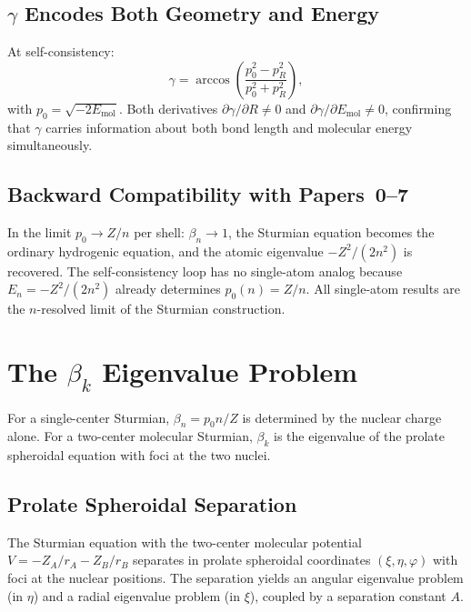 \documentclass[aps,pra,twocolumn,superscriptaddress,longbibliography]{revtex4-2}
\theoremstyle{remark}
\theoremstyle{plain}
\begin{document}
\subsection{$\gamma$ Encodes Both Geometry and Energy}

At self-consistency:
\begin{equation}
\gamma = \arccos\!\left(\frac{p_0^2 - p_R^2}{p_0^2 + p_R^2}\right),
\label{eq:gamma_sc}
\end{equation}
with $p_0 = \sqrt{-2E_{\text{mol}}}$.  Both derivatives
$\partial\gamma/\partial R \neq 0$ and
$\partial\gamma/\partial E_{\text{mol}} \neq 0$, confirming that
$\gamma$ carries information about both bond length and molecular
energy simultaneously.

\subsection{Backward Compatibility with Papers~0--7}

In the limit $p_0 \to Z/n$ per shell: $\beta_n \to 1$, the Sturmian
equation becomes the ordinary hydrogenic equation, and the atomic
eigenvalue $-Z^2/(2n^2)$ is recovered.  The self-consistency loop has
no single-atom analog because $E_n = -Z^2/(2n^2)$ already determines
$p_0(n) = Z/n$.  All single-atom results are the $n$-resolved limit
of the Sturmian construction.


\section{The $\beta_k$ Eigenvalue Problem}
\label{sec:beta}

For a single-center Sturmian, $\beta_n = p_0 n/Z$ is determined by
the nuclear charge alone.  For a two-center molecular Sturmian, $\beta_k$
is the eigenvalue of the prolate spheroidal equation with foci at the
two nuclei.

\subsection{Prolate Spheroidal Separation}

The Sturmian equation with the two-center molecular potential
$V = -Z_A/r_A - Z_B/r_B$ separates in prolate spheroidal coordinates
$(\xi, \eta, \varphi)$ with foci at the nuclear positions.  The
separation yields an angular eigenvalue problem (in $\eta$) and a
radial eigenvalue problem (in $\xi$), coupled by a separation constant
$A$.
\end{document}
